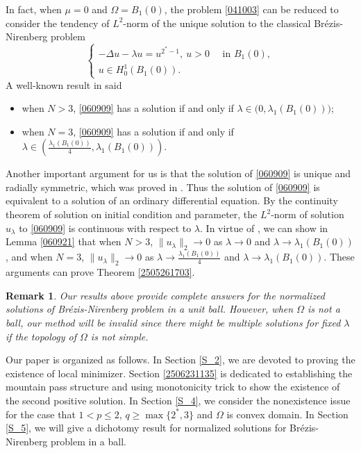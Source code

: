 \documentclass[10pt]{article}
\numberwithin{equation}{section}
\newtheorem{remark}[theorem]{Remark}
\numberwithin{equation}{section}
\begin{document}
\smallskip
In fact, when $\mu=0$ and $\Omega=B_1(0)$, the problem \eqref{041003} can be reduced to consider the tendency of $L^2$-norm of the unique solution to the classical Br\'{e}zis-Nirenberg problem
\begin{equation}\label{060909}
\begin{cases}
-\Delta u-\lambda u=u^{2^{*}-1},~ u>0 \quad\text { in } B_1(0), \\
u\in H^1_0(B_1(0)).
\end{cases}
\end{equation}
A well-known result in \cite{Brezis83} said
\begin{itemize}
\item[(i)] when $N>3$, \eqref{060909} has a solution if and only if $\lambda\in\big(0,\lambda_1(B_1(0))\big)$;
\item[(ii)] when $N=3$, \eqref{060909} has a solution if and only if $\lambda\in\left(\frac{\lambda_1(B_1(0))}{4},\lambda_1(B_1(0))\right)$.
\end{itemize}
Another important argument for us is that the solution of \eqref{060909} is unique and radially symmetric, which was proved in \cite{Zhang92}. Thus the solution of \eqref{060909} is equivalent to a solution of an ordinary differential equation. By the continuity theorem of solution on initial condition and parameter, the $L^2$-norm of solution $u_\lambda$ to \eqref{060909} is continuous with respect to $\lambda$. In virtue of \cite{Zhang92}, we can show in Lemma \ref{060921} that when $N>3$, $\|u_\lambda\|_2\to 0$ as $\lambda\to 0$ and $\lambda\to \lambda_1(B_1(0))$, and when $N=3$, $\|u_\lambda\|_2\to 0$ as $\lambda\to {\frac{\lambda_1(B_1(0))}{4}}$ and $\lambda\to \lambda_1(B_1(0))$. These arguments can prove Theorem \ref{2505261703}.




\begin{remark}
Our results above provide complete answers for the normalized solutions of Br\'{e}zis-Nirenberg problem in a unit ball. However, when $\Omega$ is not a ball, our method will be invalid since there might be multiple solutions for fixed $\lambda$ if the topology of $\Omega$ is not simple. 
\end{remark}

\medskip
Our paper is organized as follows. In Section \ref{S_2}, we are devoted to proving the existence of local minimizer. Section \ref{2506231135} is dedicated to establishing the mountain pass structure and using monotonicity trick to show the existence of the second positive solution. In Section \ref{S_4}, we consider the nonexistence issue for the case that $1<p\le 2$, $q\ge \max\{2^*, 3\}$ and $\Omega$ is convex domain. In Section \ref{S_5}, we will give a dichotomy result for normalized solutions for Br\'{e}zis-Nirenberg problem in a ball.
\end{document}
